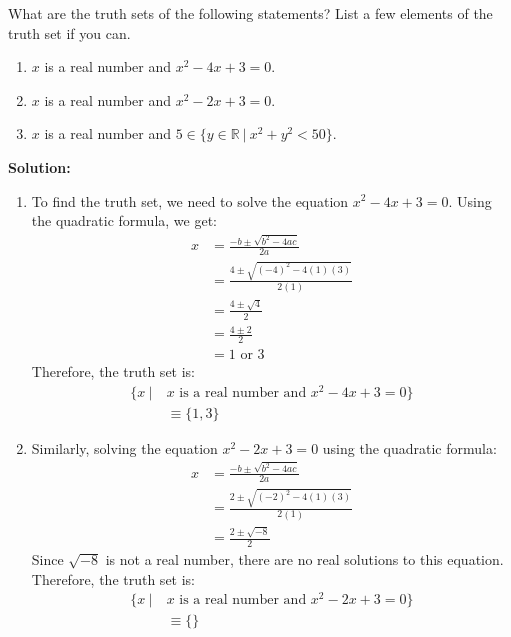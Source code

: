 What are the truth sets of the following statements? List a few elements of the truth set if you can.

\begin{enumerate}[label=(\alph*)]
    \item $x$ is a real number and $x^2-4x+3=0$.
    \item $x$ is a real number and $x^2-2x+3=0$.
    \item $x$ is a real number and $5 \in \{y \in \mathbb{R} \ | \ x^2+y^2 < 50 \}$.
\end{enumerate}

\textbf{Solution:}
\begin{enumerate}[label=(\alph*)]
    \item To find the truth set, we need to solve the equation $x^2-4x+3=0$. Using the quadratic formula, we get:
    \begin{align*}
        x &= \frac{-b \pm \sqrt{b^2-4ac}}{2a} \\
          &= \frac{4 \pm \sqrt{(-4)^2-4(1)(3)}}{2(1)} \\
          &= \frac{4 \pm \sqrt{4}}{2} \\
          &= \frac{4 \pm 2}{2} \\
          &= 1 \text{ or } 3
    \end{align*}
    Therefore, the truth set is:
    \begin{align*}
        \{ x \ | \ &x \text{ is a real number and } x^2-4x+3=0 \} \\
        &\equiv \{1, 3\}
    \end{align*}
    
    \item Similarly, solving the equation $x^2-2x+3=0$ using the quadratic formula:
    \begin{align*}
        x &= \frac{-b \pm \sqrt{b^2-4ac}}{2a} \\
          &= \frac{2 \pm \sqrt{(-2)^2-4(1)(3)}}{2(1)} \\
          &= \frac{2 \pm \sqrt{-8}}{2}
    \end{align*}
    Since $\sqrt{-8}$ is not a real number, there are no real solutions to this equation. Therefore, the truth set is:
    \begin{align*}
        \{ x \ | \ &x \text{ is a real number and } x^2-2x+3=0 \} \\
        &\equiv \{\}
    \end{align*}
    

\end{enumerate}
